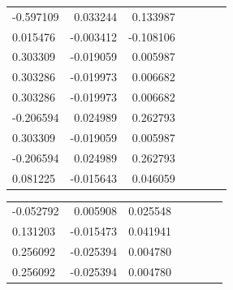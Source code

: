 \documentclass[a4paper,twoside,12pt]{book}
\begin{document}
\begin{appendices}
\begin{table}
\begin{tabular}{lrrrrrr}
	-0.597109 &  0.033244 &  0.133987 \\
	 0.015476 & -0.003412 & -0.108106 \\
	 0.303309 & -0.019059 &  0.005987 \\
	 0.303286 & -0.019973 &  0.006682 \\
	 0.303286 & -0.019973 &  0.006682 \\
	-0.206594 &  0.024989 &  0.262793 \\
	 0.303309 & -0.019059 &  0.005987 \\
	-0.206594 &  0.024989 &  0.262793 \\
	 0.081225 & -0.015643 &  0.046059 \\
	 \bottomrule
	\end{tabular}		
\end{table}
\begin{table}
	\centering
	\begin{tabular}{lrrrrrr}
		\toprule
	-0.052792 &  0.005908 &  0.025548 \\
	 0.131203 & -0.015473 &  0.041941 \\
	 0.256092 & -0.025394 &  0.004780 \\
	 0.256092 & -0.025394 &  0.004780 \\
	\bottomrule
\end{tabular}
\end{table}


\end{appendices}
\end{document}

